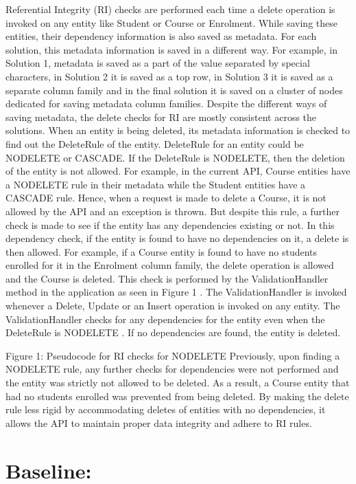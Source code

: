 \begin{description}
Referential Integrity (RI) checks are performed each time a delete
operation is invoked on any entity like Student or Course or Enrolment. While
saving these entities, their dependency information is also saved as metadata.
For each solution, this metadata information is saved in a different way. For
example, in Solution 1, metadata is saved as a part of the value separated by
special characters, in Solution 2 it is saved as a top row, in Solution 3 it is
saved as a separate column family and in the final solution it is saved on a
cluster of nodes dedicated for saving metadata column families. Despite the
different ways of saving metadata, the delete checks for RI are mostly
consistent across the solutions.
When an entity is being deleted, its metadata information is checked to find out
the DeleteRule of the entity. DeleteRule for an entity could be NODELETE or
CASCADE. If the DeleteRule is NODELETE, then the deletion of the entity is not
allowed. For example, in the current API, Course entities have a NODELETE rule
in their metadata while the Student entities have a CASCADE rule. Hence, when a
request is made to delete a Course, it is not allowed by the API and an
exception is thrown. But despite this rule, a further check is made to see if
the entity has any dependencies existing or not. In this dependency check, if
the entity is found to have no dependencies on it, a delete is then allowed. 
For example, if a Course entity is found to have no students enrolled for it in
the Enrolment column family, the delete operation is allowed and the Course is
deleted.
This check is performed by the ValidationHandler method in the application as
seen in Figure 1 . The ValidationHandler is invoked whenever a Delete, Update or
an Insert operation is invoked on any entity. The ValidationHandler checks for
any dependencies for the entity even when the DeleteRule  is NODELETE . If no
dependencies are found, the entity is deleted.
 
Figure 1: Pseudocode for RI checks for NODELETE Previously, upon finding a
NODELETE rule, any further checks for dependencies were not performed and the
entity was strictly not allowed to be deleted. As a result, a Course entity that
had no students enrolled was prevented from being deleted.
By making the delete rule less rigid by accommodating deletes of entities with
no dependencies, it allows the API to maintain proper data integrity and adhere
to RI rules.

\end{description}

\section{Baseline:  }\label{s:baseline}


